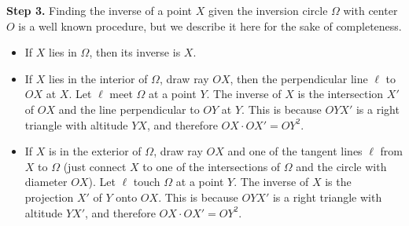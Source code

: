 \documentclass[12pt,oneside,a4paper]{book}
\begin{document}
\smallskip
\textbf{Step 3.} Finding the inverse of a point $X$ given the inversion circle $\Omega$ with center $O$ is a well known procedure, but we describe it here for the sake of completeness.
\begin{itemize}
\item If $X$ lies in $\Omega$, then its inverse is $X$.
\item If $X$ lies in the interior of $\Omega$, draw ray $OX$, then the perpendicular line $\ell$ to $OX$ at $X$. Let $\ell$ meet $\Omega$ at a point $Y$. The inverse of $X$ is the intersection $X'$ of $OX$ and the line perpendicular to $OY$ at $Y$. This is because $OYX'$ is a right triangle with altitude $YX$, and therefore $OX\cdot OX' = OY^2$.
\item If $X$ is in the exterior of $\Omega$, draw ray $OX$ and one of the tangent lines $\ell$ from $X$ to $\Omega$ (just connect $X$ to one of the intersections of $\Omega$ and the circle with diameter $OX$). Let $\ell$ touch $\Omega$ at a point $Y$. The inverse of $X$ is the projection $X'$ of $Y$ onto $OX$. This is because $OYX'$ is a right triangle with altitude $YX'$, and therefore $OX\cdot OX' = OY^2$.
\end{itemize}

\begin{center}
\end{center}
\end{document}

